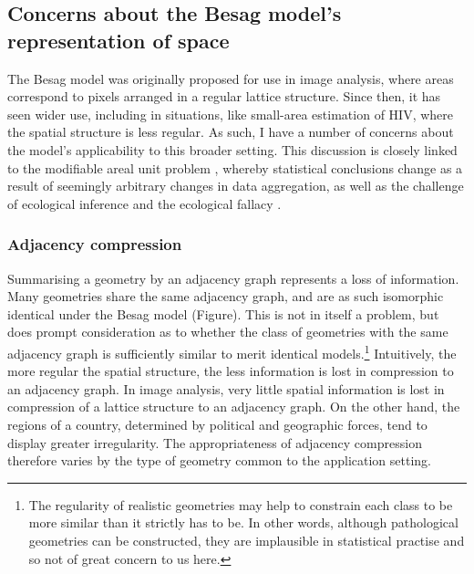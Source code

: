 \documentclass[a4paper, nobind]{templates/ociamthesis}
\begin{document}
\hypertarget{concerns-about-the-besag-models-representation-of-space}{%
\subsection{Concerns about the Besag model's representation of space}\label{concerns-about-the-besag-models-representation-of-space}}

The Besag model was originally proposed for use in image analysis, where areas correspond to pixels arranged in a regular lattice structure.
Since then, it has seen wider use, including in situations, like small-area estimation of HIV, where the spatial structure is less regular.
As such, I have a number of concerns about the model's applicability to this broader setting.
This discussion is closely linked to the modifiable areal unit problem \autocite{openshow1979million}, whereby statistical conclusions change as a result of seemingly arbitrary changes in data aggregation, as well as the challenge of ecological inference and the ecological fallacy \autocite{wakefield2010aggregation}.

\hypertarget{adjacency-compression}{%
\subsubsection{Adjacency compression}\label{adjacency-compression}}

Summarising a geometry by an adjacency graph represents a loss of information.
Many geometries share the same adjacency graph, and are as such isomorphic identical under the Besag model (Figure).
This is not in itself a problem, but does prompt consideration as to whether the class of geometries with the same adjacency graph is sufficiently similar to merit identical models.\footnote{The regularity of realistic geometries may help to constrain each class to be more similar than it strictly has to be. In other words, although pathological geometries can be constructed, they are implausible in statistical practise and so not of great concern to us here.}
Intuitively, the more regular the spatial structure, the less information is lost in compression to an adjacency graph.
In image analysis, very little spatial information is lost in compression of a lattice structure to an adjacency graph.
On the other hand, the regions of a country, determined by political and geographic forces, tend to display greater irregularity.
The appropriateness of adjacency compression therefore varies by the type of geometry common to the application setting.
\end{document}
